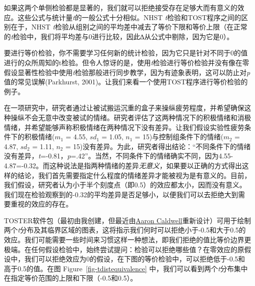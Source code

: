 \documentclass[
  letterpaper,
  DIV=11,
  numbers=noendperiod]{scrreprt}
\begin{document}
如果这两个单侧检验都是显著的，我们就可以拒绝接受存在足够大而有意义的效应。这些公式与统计量\emph{t}的一般公式十分相似。NHST
\emph{t}检验和TOST程序之间的区别在于，NHST
\emph{t}检验从组别之间的平均差中减去了等价下限和等价上限（在正常的\emph{t}检验中，我们将平均差与0进行比较，因此∆从公式中剔除，因为它是0）。

要进行等价检验，你不需要学习任何新的统计检验，因为它只是针对不同于0的值进行的众所周知的t检验。但令人惊讶的是，使用\emph{t}检验进行等价检验并没有像在零假设显著性检验中使用\emph{t}检验那般进行同步教学，因为有迹象表明，这可以防止对\emph{p}值的常见误解(Parkhurst,
2001)。让我们来看一个使用TOST程序进行等价检验的例子。

在一项研究中，研究者通过让被试搬运沉重的盒子来操纵疲劳程度，并希望确保这种操纵不会无意中改变被试的情绪。研究者评估了这两种情况下的积极情绪和消极情绪，并希望能够声称积极情绪在两种情况下没有差异。让我们假设实验性疲劳条件下的积极情绪(\(m_1\)
= 4.55, \(sd_1\) = 1.05, \(n_1\) = 15)与控制组条件下的情绪(\(m_2\) =
4.87, \(sd_2\) = 1.11, \(n_2\) =
15)没有差异。为此，研究者得出结论：``不同条件下的情绪没有差异，\emph{t}=-0.81，\emph{p}=.42''。当然，不同条件下的情绪确实不同，因为4.55-4.87=-0.32。而这种说法是指两种情绪的差异\emph{无意义}，如果要以正确的方式得出这样的结论，我们首先需要指定什么程度的情绪差异才能被视为是有意义的。目前，我们假设，研究者认为小于半个刻度点（即0.5）的效应都太小，因而没有意义。我们现在检验观察到的-0.32的平均差异是否足够小，以便我们可以去拒绝大到需要重视的效应的存在。

TOSTER软件包（最初由我创建，但最近由\href{https://aaroncaldwell.us/}{Aaron
Caldwell}重新设计）可用于绘制两个\emph{t}分布及其临界区域的图表，这将指示我们何时可以拒绝小于-0.5和大于0.5的效应。我们可能需要一些时间来习惯这样一种想法，即我们拒绝的值比等价边界更极端。在任何假设检验中，始终尝试提问：检验可以拒绝哪些值？在零效应的原假设中，我们可以拒绝效应为0的假设，在下图的等价检验中，可以拒绝低于-0.5和高于0.5的值。在图
Figure~\ref{fig-tdistequivalence}
中，我们可以看到两个\emph{t}分布集中在指定等价范围的上限和下限（-0.5和0.5）。
\end{document}
